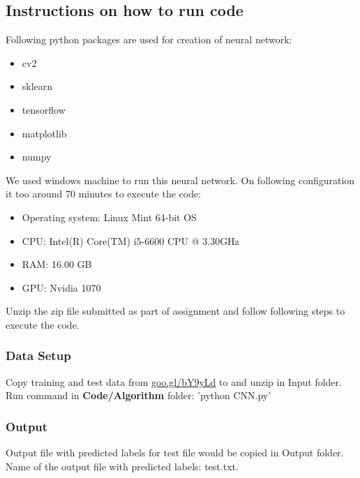 \documentclass[fleqn,10pt]{SelfArx} %
\begin{document}
\subsection{Instructions on how to run code}
Following python packages are used for creation of neural network:
\begin{itemize}
\itemsep0em
  \item cv2
  \item sklearn
  \item tensorflow
  \item matplotlib
  \item numpy
\end{itemize}
We used windows machine to run this neural network. On following configuration it too around 70 minutes to execute the code:
\begin{itemize}
\itemsep0em
  \item Operating system: Linux Mint 64-bit OS
  \item CPU: Intel(R) Core(TM) i5-6600 CPU @ 3.30GHz
  \item RAM: 16.00 GB
  \item GPU: Nvidia 1070
\end{itemize}
Unzip the zip file submitted as part of assignment and follow following steps to execute the code.
\subsubsection{Data Setup}
Copy training and test data from \url{goo.gl/bY9yLd} to and unzip in Input folder.
\newline
Run command in \textbf{Code/Algorithm} folder: 'python CNN.py'

\subsubsection{Output}
Output file with predicted labels for test file would be copied in Output folder. Name of the output file with predicted labels: test.txt.
\end{document}
